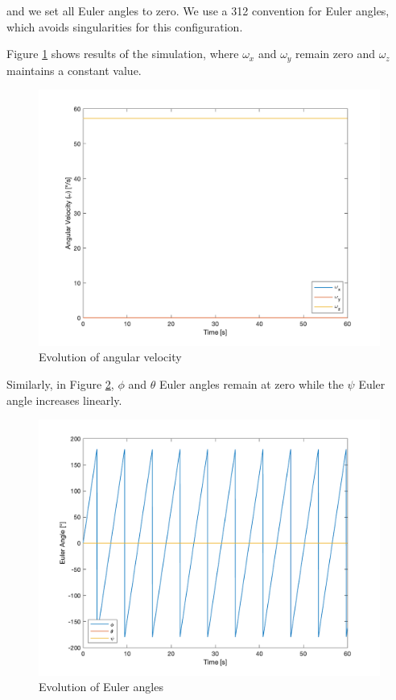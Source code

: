 and we set all Euler angles to zero. We use a 312 convention for Euler angles, which avoids singularities for this configuration.

Figure \ref{fig:ps4_problem1a_angvel} shows results of the simulation, where $\omega_x$ and $\omega_y$ remain zero and $\omega_z$ maintains a constant value.

\begin{figure}[H]
\centering
\includegraphics[scale=0.6]{Images/ps4_problem1a_angvel.png}
\caption{Evolution of angular velocity}
\label{fig:ps4_problem1a_angvel}
\end{figure}

Similarly, in Figure \ref{fig:ps4_problem1a_angle}, $\phi$ and $\theta$ Euler angles remain at zero while the $\psi$ Euler angle increases linearly.

\begin{figure}[H]
\centering
\includegraphics[scale=0.6]{Images/ps4_problem1a_angle.png}
\caption{Evolution of Euler angles}
\label{fig:ps4_problem1a_angle}
\end{figure}


